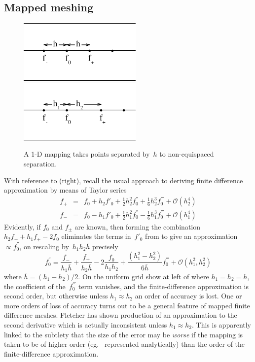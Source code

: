 \subsection{Mapped meshing}\label{sec:mapped}
\begin{figure}[h]
\centerline{\includegraphics[width=6cm]{../pics/basic}
\includegraphics[width=6cm]{../pics/basic2}
}
\caption{A 1-D mapping takes points separated by~$h$ to non-equispaced separation.
\label{fig:basic}}
\end{figure}
With reference to (right),
recall the usual approach to deriving finite difference approximation by
means of Taylor series
\begin{eqnarray} \label{eq:taylor}
f_+&=&f_0 + h_2 f'_0 + \frac{1}{2} h_2^2 f^{''}_0 + \frac{1}{6} h_2^3 f^{'''}_0 + \mathcal{O}(h_2^4)\\
f_-&=&f_0 - h_1 f'_0 + \frac{1}{2} h_1^2 f^{''}_0 - \frac{1}{6} h_1^3 f^{'''}_0 + \mathcal{O}(h_1^4)
\end{eqnarray}
Evidently, if $f_0$ and $f_\pm$ are known, then forming the combination 
$h_2 f_- + h_1 f_+ - 2f_0$ eliminates the terms in~$f'_0$ from 
to give an approximation $\propto f^{''}_0$,
on rescaling by~$h_1 h_2 \bar{h}$ precisely
\begin{equation} \label{eq:ddf}
f^{''}_0 = \frac{f_-}{h_1 \bar{h}} +  \frac{f_+}{h_2 \bar{h}} -2 \frac{f_0}{h_1 h_2} + \frac{(h_1^2-h_2^2)}{6\bar{h}} f^{'''}_0 + \mathcal{O}(h_1^2,h_2^2)
\end{equation}
where $\bar{h} = (h_1+h_2)/2$. On the uniform grid show at left of 
where $h_1=h_2=h$, the coefficient of the~$f^{'''}_0$
term vanishes, and the finite-difference approximation is second order, but otherwise unless $h_1\approx h_2$
an order of accuracy is lost. 
One or more orders of loss of accuracy turns out to be a general feature of mapped
finite difference meshes.  Fletcher %
has shown production of an approximation to the second derivative
which is actually inconsistent unless $h_1\approx h_2$.
This is apparently linked to the subtlety that the size of
the error may be \emph{worse} if the mapping is taken to be of
higher order (eg. \ represented analytically) than the 
order of the finite-difference approximation.

